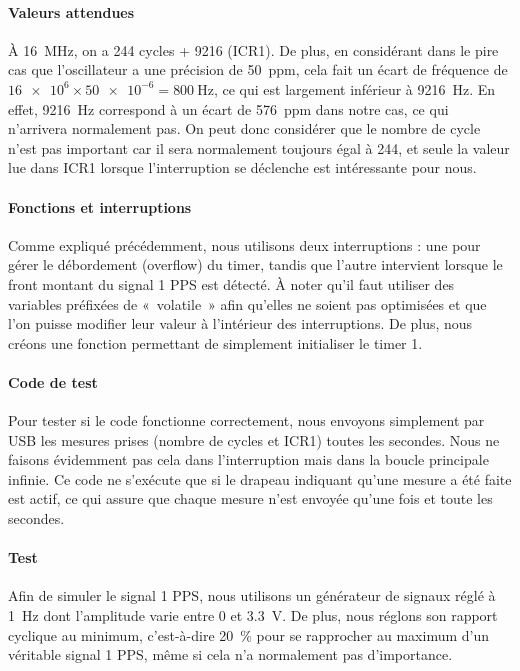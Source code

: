 \documentclass[12pt, a4paper, titlepage]{article}
\begin{document}
\paragraph{Valeurs attendues}

À \SI{16}{\mega\hertz}, on a 244 cycles + 9216 (ICR1). De plus, en considérant dans le pire cas que l'oscillateur a une précision de \SI{50}{ppm}, cela fait un écart de fréquence de $\num{16e6} \times \num{50e-6} = \SI{800}{\hertz}$, ce qui est largement inférieur à \SI{9216}{\hertz}. En effet, \SI{9216}{\hertz} correspond à un écart de \SI{576}{ppm} dans notre cas, ce qui n'arrivera normalement pas. On peut donc considérer que le nombre de cycle n'est pas important car il sera normalement toujours égal à 244, et seule la valeur lue dans ICR1 lorsque l'interruption se déclenche est intéressante pour nous.

\paragraph{Fonctions et interruptions}

Comme expliqué précédemment, nous utilisons deux interruptions : une pour gérer le débordement (overflow) du timer, tandis que l'autre intervient lorsque le front montant du signal 1 PPS est détecté. À noter qu'il faut utiliser des variables préfixées de «~volatile~» afin qu'elles ne soient pas optimisées et que l'on puisse modifier leur valeur à l'intérieur des interruptions. De plus, nous créons une fonction permettant de simplement initialiser le timer 1.

\paragraph{Code de test}

Pour tester si le code fonctionne correctement, nous envoyons simplement par USB les mesures prises (nombre de cycles et ICR1) toutes les secondes. Nous ne faisons évidemment pas cela dans l'interruption mais dans la boucle principale infinie. Ce code ne s'exécute que si le drapeau indiquant qu'une mesure a été faite est actif, ce qui assure que chaque mesure n'est envoyée qu'une fois et toute les secondes.

\paragraph{Test}

Afin de simuler le signal 1 PPS, nous utilisons un générateur de signaux réglé à \SI{1}{\hertz} dont l'amplitude varie entre 0 et \SI{3.3}{\volt}. De plus, nous réglons son rapport cyclique au minimum, c'est-à-dire \SI{20}{\percent} pour se rapprocher au maximum d'un véritable signal 1 PPS, même si cela n'a normalement pas d'importance.
\end{document}
